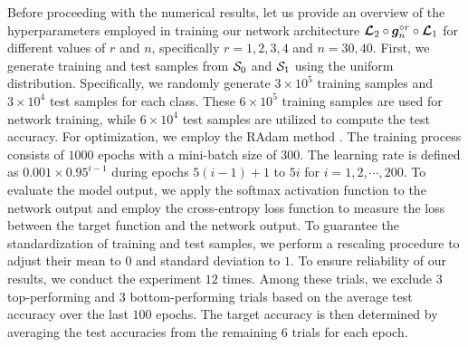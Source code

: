 \documentclass[nohyperref]{article}
\theoremstyle{plain}
\theoremstyle{definition}
\theoremstyle{remark}
\begin{document}
Before proceeding with the numerical results, let us provide an overview of the hyperparameters employed in training our network architecture ${\bm{\mathcal{L}}}_2\circ {\bm{g}}_n^{\circ r}\circ {\bm{\mathcal{L}}}_1$ for different values of $r$ and $n$, specifically $r=1,2,3,4$ and $n=30,40$.
First, we generate training and test samples from ${\mathcal{S}}_0$ and ${\mathcal{S}}_1$ using the uniform distribution. Specifically, we randomly generate $3\times 10^5$ training samples and $3\times 10^4$ test samples for each class. These $6\times 10^5$ training samples are used for network training, while $6\times 10^4$ test samples are utilized to compute the test accuracy.
For optimization, we employ the RAdam method \cite{Liu2020On}. The training process consists of $1000$ epochs with a mini-batch size of $300$. The learning rate  is defined as $0.001\times0.95^{i-1}$  during epochs $5(i-1)+1$ to $5i$ for $i=1,2,\cdots,200$. 
To evaluate the model output, we apply the softmax activation function to the network output and employ the cross-entropy loss function to measure the loss between the target function and the network output.
To guarantee the standardization of training and test samples, we perform a rescaling procedure to adjust their mean to $0$ and standard deviation to $1$.
To ensure reliability of our results, we conduct the experiment $12$ times. Among these trials, 
we exclude $3$ top-performing and $3$ bottom-performing trials based on the average test accuracy over the last $100$ epochs. 
The target accuracy is then determined by averaging the test accuracies from the remaining $6$ trials for each epoch.
\end{document}
